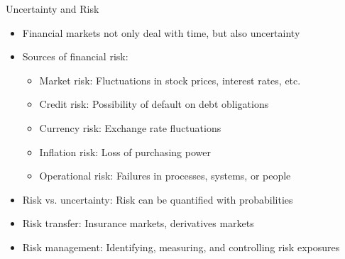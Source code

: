 \documentclass[10pt]{beamer}
\begin{document}
\begin{frame}{Uncertainty and Risk}
  \begin{itemize}[<+->]
    \item Financial markets not only deal with time, but also uncertainty
    \item Sources of financial risk:
      \begin{itemize}
        \item Market risk: Fluctuations in stock prices, interest rates, etc.
        \item Credit risk: Possibility of default on debt obligations
        \item Currency risk: Exchange rate fluctuations
        \item Inflation risk: Loss of purchasing power
        \item Operational risk: Failures in processes, systems, or people
      \end{itemize}
    \item Risk vs. uncertainty: Risk can be quantified with probabilities
    \item Risk transfer: Insurance markets, derivatives markets
    \item Risk management: Identifying, measuring, and controlling risk exposures
  \end{itemize}
\end{frame}

%      
%      
%      
\end{document}
